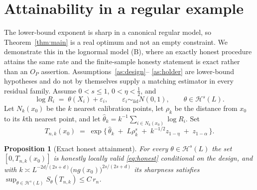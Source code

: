 \documentclass[11pt]{article}
\newtheorem{proposition}[theorem]{Proposition}
\theoremstyle{definition}
\theoremstyle{remark}
\newcommand{\Hs}[1][s]{\mathcal{H}^{#1}}
\begin{document}
\section{Attainability in a regular example}\label{sec:attain}

The lower-bound exponent is sharp in a canonical regular model, so Theorem~\ref{thm:main}
is a real optimum and not an empty constraint. We demonstrate this in the lognormal
model (B), where an exactly honest procedure attains the same rate and the finite-sample
honesty statement is exact rather than an $O_P$ assertion. Assumptions~\ref{as:design}--%
\ref{as:holder} are lower-bound hypotheses and do not by themselves supply a matching
estimator in every residual family. Assume $0<s\le1$, $0<\eta<\tfrac12$, and
\[
  \log R_i \;=\; \theta(X_i) + \varepsilon_i,
  \qquad \varepsilon_i \sim_{\mathrm{iid}} N(0,1),
  \qquad \theta \in \Hs(L).
\]
Let $N_k(x_0)$ be the $k$ nearest calibration points, let $\rho_k$ be the distance from
$x_0$ to its $k$th nearest point, and let $\widehat\theta_k = k^{-1}\sum_{i\in
N_k(x_0)}\log R_i$. Set
\begin{equation}\label{eq:knn}
  T_{n,k}(x_0) \;=\; \exp\!\Big\{\, \widehat\theta_k
    \;+\; L\rho_k^{s} \;+\; k^{-1/2} z_{1-\eta} \;+\; z_{1-\alpha} \,\Big\}.
\end{equation}

\begin{proposition}[Exact honest attainment]\label{prop:attain}
For every $\theta\in\Hs(L)$ the set $[0,T_{n,k}(x_0)]$ is honestly locally valid
\eqref{eq:honest} conditional on the design, and with $k \asymp
L^{-2d/(2s+d)}\big(n g(x_0)\big)^{2s/(2s+d)}$ its sharpness satisfies
$\sup_{\theta\in\Hs(L)} S_\theta(T_{n,k}) \le C\,r_n$.
\end{proposition}
\end{document}
